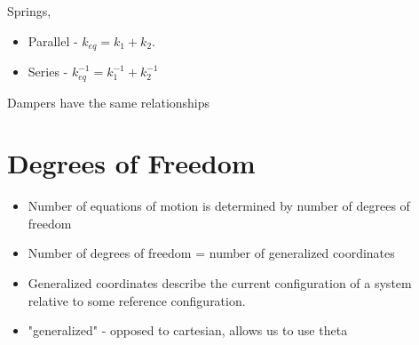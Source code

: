 \documentclass[12pt, a4paper]{report}
\begin{document}
  Springs,

  \begin{itemize}
    \item Parallel - $ k_{eq} = k_1 + k_2. $
    \item Series - $ k_{eq}^{-1} = k_1^{-1} + k_2^{-1} $
  \end{itemize}

  Dampers have the same relationships

  \section{Degrees of Freedom}

  \begin{itemize}
    \item Number of equations of motion is determined by number of degrees of freedom
    \item Number of degrees of freedom = number of generalized coordinates
    \item Generalized coordinates describe the current configuration of a system relative to some reference configuration.
    \item "generalized" - opposed to cartesian, allows us to use theta
  \end{itemize}
\end{document}
